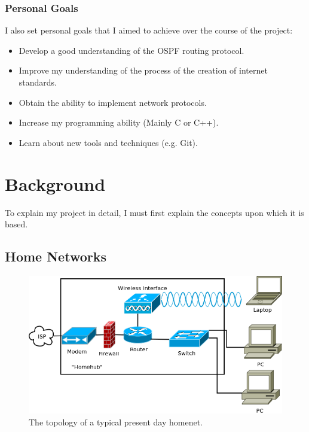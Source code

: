 \documentclass[12pt,a4paper,twoside]{report}
\begin{document}
\subsection{Personal Goals}
I also set personal goals that I aimed to achieve over the course of the
project:
\begin{itemize}
	\item Develop a good understanding of the OSPF routing protocol.
	\item Improve my understanding of the process of the creation of internet
		standards.
	\item Obtain the ability to implement network protocols.
	\item Increase my programming ability (Mainly C or C++).
	\item Learn about new tools and techniques (e.g. Git).
\end{itemize}

\chapter{Background}
To explain my project in detail, I must first explain the concepts upon which
it is based.

\section{Home Networks}

\begin{figure}
\begin{center}
  \includegraphics[width=\linewidth]{../Diagrams/Network/TypicalHomenet.png}
	\caption{The topology of a typical present day homenet.}\label{fig:typical_homenet}
\end{center}
\end{figure}
\end{document}
